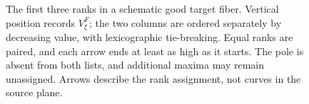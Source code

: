 \begin{figure}[htbp]
\centering
{}
\caption{The first three ranks in a schematic good target fiber. Vertical
position records $V^F_\xi$; the two columns are ordered separately by decreasing
value, with lexicographic tie-breaking. Equal ranks are paired, and each arrow
ends at least as high as it starts.
The pole is absent from both lists, and additional maxima may remain unassigned.
Arrows describe the rank assignment, not curves in the source plane.}
\label{fig:rank-pairing}
\end{figure}
